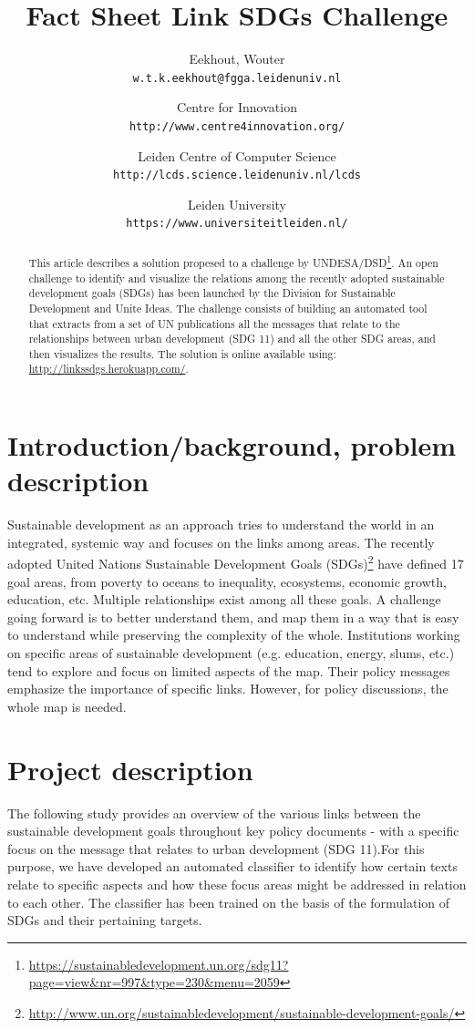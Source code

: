 \documentclass[]{article}
\title{Fact Sheet Link SDGs Challenge}
\author{
	  Eekhout, Wouter\\
	  \texttt{w.t.k.eekhout@fgga.leidenuniv.nl}
	  \and
	  Centre for Innovation\\
	  \texttt{http://www.centre4innovation.org/}
	  \and
	  Leiden Centre of Computer Science\\
	  \texttt{http://lcds.science.leidenuniv.nl/lcds}
	  \and
	  Leiden University\\
	  \texttt{https://www.universiteitleiden.nl/}
}
\begin{document}
\maketitle

\begin{abstract}
This article describes a solution propesed to a challenge by UNDESA/DSD\footnote{\url{https://sustainabledevelopment.un.org/sdg11?page=view&nr=997&type=230&menu=2059}}. 
An open challenge to identify and visualize the relations among the recently adopted sustainable development goals (SDGs) has been launched by the Division for Sustainable Development and Unite Ideas. The challenge consists of building an automated tool that extracts from a set of UN publications all the messages that relate to the relationships between urban development (SDG 11) and all the other SDG areas, and then visualizes the results. 
The solution is online available using: \url{http://linkssdgs.herokuapp.com/}.
\end{abstract}

\section{Introduction/background, problem description}
Sustainable development as an approach tries to understand the world in an integrated, systemic way and focuses on the links among areas. The recently adopted United Nations Sustainable Development Goals (SDGs)\footnote{\url{http://www.un.org/sustainabledevelopment/sustainable-development-goals/}} have defined 17 goal areas, from poverty to oceans to inequality, ecosystems, economic growth, education, etc. Multiple relationships exist among all these goals. A challenge going forward is to better understand them, and map them in a way that is easy to understand while preserving the complexity of the whole. Institutions working on specific areas of sustainable development (e.g. education, energy, slums, etc.) tend to explore and focus on limited aspects of the map. Their policy messages emphasize the importance of specific links. However, for policy discussions, the whole map is needed.

\section{Project description}
The following study provides an overview of the various links between the sustainable development goals throughout key policy documents - with a specific focus on the message that relates to urban development (SDG 11).For this purpose, we have developed an automated classifier to identify how certain texts relate to specific aspects and how these focus areas might be addressed in relation to each other. The classifier has been trained on the basis of the formulation of SDGs and their pertaining targets.
\end{document}
